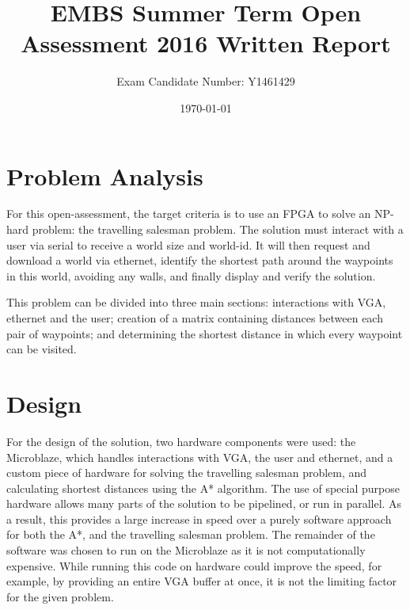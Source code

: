 \documentclass[a4paper, 11pt]{article}
\title{EMBS Summer Term Open Assessment 2016 Written Report}
\author{Exam Candidate Number: Y1461429}
\date{\today}
\begin{document}
\maketitle
\section{Problem Analysis} %
For this open-assessment, the target criteria is to use an FPGA to solve an NP-hard 
problem: the travelling salesman problem. The solution must interact with a user 
via serial to receive a world size and world-id. It will then
request and download a world via ethernet, identify the shortest path around the 
waypoints in this world, avoiding any walls, and finally display and verify the solution. 
\par\bigskip\noindent
This problem can be divided into three main sections: interactions with VGA, ethernet
and the user; creation of a matrix containing distances between each pair of waypoints;
and determining the shortest distance in which every waypoint can be visited.

\section{Design} %
For the design of the solution, two hardware components were used: the Microblaze, 
which handles interactions with VGA, the user and ethernet, 
and a custom piece of hardware for solving the travelling salesman problem, and 
calculating shortest distances using the A* algorithm. The use of special purpose 
hardware allows many parts of the solution to be pipelined, or run in parallel. 
As a result, this provides a large increase in speed over a purely software approach 
for both the A*, and the travelling salesman problem. The remainder of the software 
was chosen to run on the Microblaze as it is not computationally expensive. 
While running this code on hardware could improve the speed, for example, by 
providing an entire VGA buffer at once, it is not the limiting factor for the 
given problem.
\end{document}

